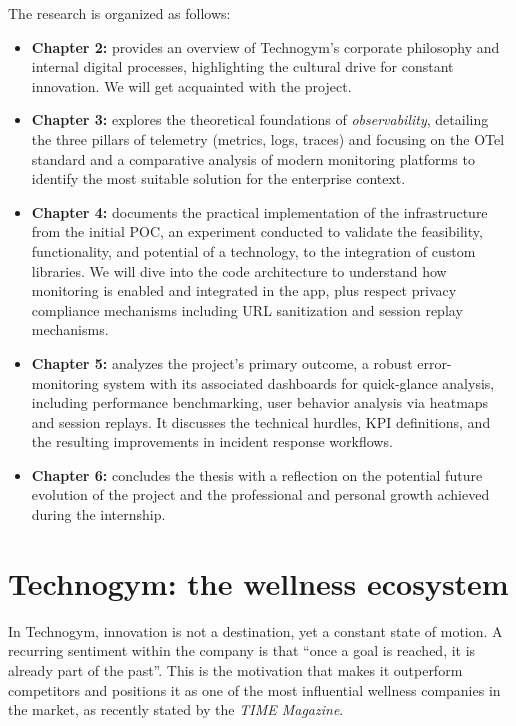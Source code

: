 \documentclass[12pt,a4paper,openright,twoside]{book}
\begin{document}
\par The research is organized as follows:
\begin{itemize}[nosep]
    \item \textbf{Chapter 2:} provides an overview of Technogym’s corporate philosophy and internal digital processes, highlighting the cultural drive for constant innovation. We will get acquainted with the project. 
    \item \textbf{Chapter 3:} explores the theoretical foundations of \textit{observability}, detailing the three pillars of telemetry (metrics, logs, traces) and focusing on the \ac{OTel} standard and a comparative analysis of modern monitoring platforms to identify the most suitable solution for the enterprise context. 
    \item \textbf{Chapter 4:} documents the practical implementation of the infrastructure from the initial \ac{POC}, an experiment conducted to validate the feasibility, functionality, and potential of a technology, to the integration of custom libraries. We will dive into the code architecture to understand how monitoring is enabled and integrated in the app, plus respect privacy compliance mechanisms including URL sanitization and session replay mechanisms. 
    \item \textbf{Chapter 5:} analyzes the project's primary outcome, a robust error-monitoring system with its associated dashboards for quick-glance analysis, including performance benchmarking, user behavior analysis via heatmaps and session replays. It discusses the technical hurdles, \ac{KPI} definitions, and the resulting improvements in incident response workflows.  
    \item \textbf{Chapter 6:} concludes the thesis with a reflection on the potential future evolution of the project and the professional and personal growth achieved during the internship.
\end{itemize}

\chapter{Technogym: the wellness ecosystem}

In Technogym, innovation is not a destination, yet a constant state of motion. A recurring sentiment within the company is that ``once a goal is reached, it is already part of the past''. This is the motivation that makes it outperform competitors and positions it as one of the most influential wellness companies in the market, as recently stated by the \textit{TIME Magazine}. 
\end{document}
